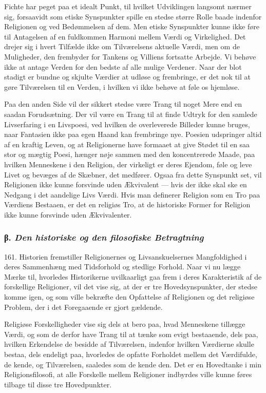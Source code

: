 \documentclass[12pt,a4paper]{book}
\newcommand{\apage}[1]{\marginnote{\footnotesize\textit{[#1]}}}
\begin{document}
Fichte har peget paa et idealt Punkt, til hvilket Udviklingen langsomt nærmer sig, forsaavidt
som etiske Synspunkter spille en stedse større Rolle baade indenfor Religionen og ved
Bedømmelsen af dem. Men etiske Synspunkter kunne ikke føre til Antagelsen af en fuldkommen
Harmoni mellem Værdi og Virkelighed. Det drejer sig i hvert Tilfælde ikke om Tilværelsens
aktuelle Værdi, men om de Muligheder, den frembyder for Tankens og Villiens fortsatte
Arbejde. Vi behøve ikke at antage Verden for den bedste af alle mulige Verdener. Naar der
blot stadigt er bundne og skjulte Værdier at udløse og frembringe, er det nok til at gøre
Tilværelsen til en Verden, i hvilken vi ikke behøve at føle os hjemløse.

Paa den anden Side vil der sikkert stedse være Trang til noget Mere end en saadan
Forudsætning. Der vil være en Trang til at finde Udtryk for den samlede Livserfaring \apage{385} i en
Livspoesi, ved hvilken de overleverede Billeder kunne bruges, naar Fantasien ikke paa egen
Haand kan frembringe nye. Poesien udspringer altid af en kraftig Leven, og at Religionerne
have formaaet at give Stødet til en saa stor og mægtig Poesi, hænger nøje sammen med den
koncentrerede Maade, paa hvilken Menneskene i den Religion, der virkeligt er deres Ejendom, føle og leve Livet og bevæges af de Skæbner, det medfører. Ogsaa fra dette Synspunkt set, vil
Religionen ikke kunne forsvinde uden Ækvivalent --- hvis der ikke skal ske en Nedgang i det
aandelige Livs Værdi. Hvis man definerer Religion som en Tro paa Værdiens Bestaaen, er det en
religiøs Tro, at de historiske Former for Religion ikke kunne forsvinde uden Ækvivalenter.

\subsubsection*{β. \emph{Den historiske og den filosofiske Betragtning}}

161. Historien fremstiller Religionernes og Livsanskuelsernes Mangfoldighed i deres
Sammenhæng med Tidsforhold og stedlige Forhold. Naar vi nu lægge Mærke til, hvorledes
Historikerne uvilkaarligt gaa frem i deres Karakteristik af de forskellige Religioner, vil
det vise sig, at der er tre Hovedsynspunkter, der stedse komme igen, og som ville bekræfte
den Opfattelse af Religionen og det religiøse Problem, der i det Foregaaende er gjort
gældende.

Religiøse Forskelligheder vise sig dels at bero paa, hvad Menneskene tillægge Værdi, og som
de derfor have Trang til at tænke som evigt bestaaende, dels paa, hvilken Erkendelse de
besidde af Tilværelsen, indenfor hvilken Værdierne skulle bestaa, dels endeligt paa,
hvorledes de opfatte Forholdet mellem det Værdifulde, de kende, og Tilværelsen, saaledes som
de kende den. Det er en Hovedtanke i min Religionsfilosofi, at alle Forskelle mellem
Religioner indbyrdes ville kunne føres tilbage til disse tre Hovedpunkter.
\end{document}
